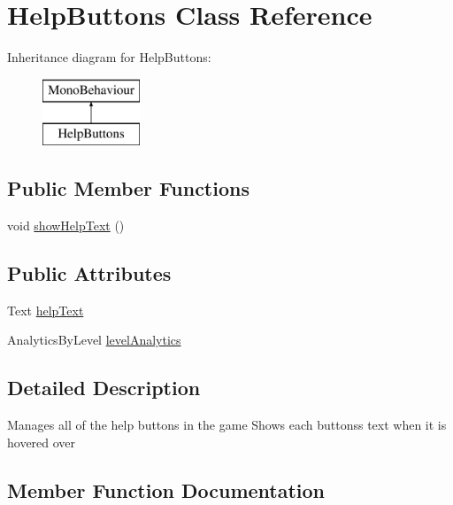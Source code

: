 \hypertarget{class_help_buttons}{}\section{Help\+Buttons Class Reference}
\label{class_help_buttons}
Inheritance diagram for Help\+Buttons\+:\begin{figure}[H]
\begin{center}
\leavevmode
\includegraphics[height=2.000000cm]{class_help_buttons}
\end{center}
\end{figure}
\subsection*{Public Member Functions}
\begin{DoxyCompactItemize}
\item 
void \hyperlink{class_help_buttons_a9726fde5562db44998eb42b897de48ac}{show\+Help\+Text} ()
\end{DoxyCompactItemize}
\subsection*{Public Attributes}
\begin{DoxyCompactItemize}
\item 
Text \hyperlink{class_help_buttons_ab183c5e89514936aac4fdb0fb27d3ba3}{help\+Text}
\item 
Analytics\+By\+Level \hyperlink{class_help_buttons_ad47263338c2ea5515badf5dc8a8bb18b}{level\+Analytics}
\end{DoxyCompactItemize}


\subsection{Detailed Description}
Manages all of the help buttons in the game Show\textquotesingle{}s each buttons\textquotesingle{}s text when it is hovered over 

\subsection{Member Function Documentation}
\mbox{\label{class_help_buttons_a9726fde5562db44998eb42b897de48ac}} 
